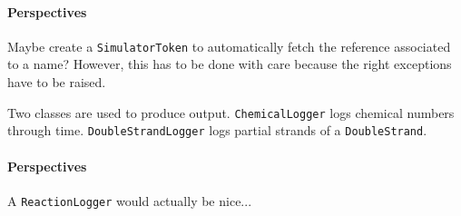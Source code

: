 \paragraph{Perspectives} Maybe create a \texttt{SimulatorToken} to automatically fetch the reference associated to a name? However, this has to be done with care because the right exceptions have to be raised.


Two classes are used to produce output. \texttt{ChemicalLogger} logs chemical numbers through time. \texttt{DoubleStrandLogger} logs partial strands of a \texttt{DoubleStrand}.

\paragraph{Perspectives} A \texttt{ReactionLogger} would actually be nice...
